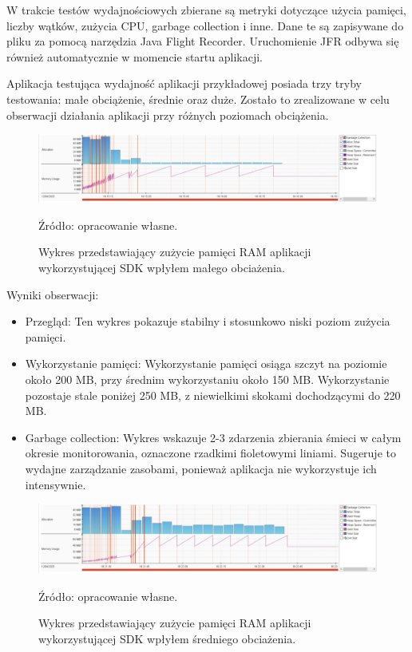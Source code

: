 \documentclass[runningheads,12pt]{llncs}
\begin{document}
W trakcie testów wydajnościowych zbierane są metryki dotyczące użycia pamięci, liczby wątków, zużycia CPU, garbage collection i inne. Dane te są zapisywane do pliku za pomocą narzędzia Java Flight Recorder. Uruchomienie JFR odbywa się również automatycznie w momencie startu aplikacji.

Aplikacja testująca wydajność aplikacji przykładowej posiada trzy tryby testowania: małe obciążenie, średnie oraz duże. Zostało to zrealizowane w celu obserwacji działania aplikacji przy różnych poziomach obciążenia.

\newpage


\begin{figure}
    \includegraphics[width=\linewidth]{images/sdk-memory-low-graph.jpg}
    \caption{Wykres przedstawiający zużycie pamięci  RAM aplikacji wykorzystującej SDK wpłyłem małego obciażenia.} \label{fig1}
    \vspace{0.5em}
    {\small Źródło: opracowanie własne.}
\end{figure}

Wyniki obserwacji:

\begin{itemize}
    \item Przegląd: Ten wykres pokazuje stabilny i stosunkowo niski poziom zużycia pamięci.
    \item Wykorzystanie pamięci: Wykorzystanie pamięci osiąga szczyt na poziomie około 200 MB, przy średnim wykorzystaniu około 150 MB. Wykorzystanie pozostaje stale poniżej 250 MB, z niewielkimi skokami dochodzącymi do 220 MB.
    \item Garbage collection: Wykres wskazuje 2-3 zdarzenia zbierania śmieci w całym okresie monitorowania, oznaczone rzadkimi fioletowymi liniami. Sugeruje to wydajne zarządzanie zasobami, ponieważ aplikacja nie wykorzystuje ich intensywnie.
\end{itemize}

\newpage

\begin{figure}
    \includegraphics[width=\linewidth]{images/sdk-memory-middle-graph.jpg}
    \caption{Wykres przedstawiający zużycie pamięci  RAM aplikacji wykorzystującej SDK wpłyłem średniego obciażenia.} \label{fig1}
    \vspace{0.5em}
    {\small Źródło: opracowanie własne.}
\end{figure}
\end{document}
